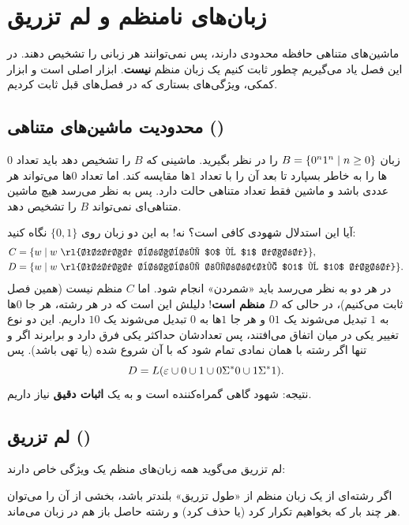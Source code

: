 \chapter{زبان‌های نامنظم و لم تزریق}

ماشین‌های متناهی حافظه محدودی دارند، پس نمی‌توانند هر زبانی را تشخیص دهند. در این فصل یاد می‌گیریم چطور ثابت کنیم یک زبان منظم \textbf{نیست}. ابزار اصلی  است و ابزار کمکی، ویژگی‌های بستاری که در فصل‌های قبل ثابت کردیم.

\section{محدودیت ماشین‌های متناهی ()}

زبان $B=\{0^n1^n\mid n\ge0\}$ را در نظر بگیرید. ماشینی که $B$ را تشخیص دهد باید تعداد $0$ها را به خاطر بسپارد تا بعد آن را با تعداد $1$ها مقایسه کند. اما تعداد $0$ها می‌تواند هر عددی باشد و ماشین فقط تعداد متناهی حالت دارد. پس به نظر می‌رسد هیچ ماشین متناهی‌ای نمی‌تواند $B$ را تشخیص دهد.

آیا این استدلال شهودی کافی است؟ نه! به این دو زبان روی $\{0,1\}$ نگاه کنید:
\begin{align*}
C&=\{w\st w\ \text{\rl{تعداد برابری $0$ و $1$ دارد}}\},\\
D&=\{w\st w\ \text{\rl{تعداد برابری زیررشته $01$ و $10$ دارد}}\}.
\end{align*}
در هر دو به نظر می‌رسد باید «شمردن» انجام شود. اما $C$ منظم نیست (همین فصل ثابت می‌کنیم)، در حالی که $D$ \textbf{منظم است}! دلیلش این است که در هر رشته، هر جا $0$ها به $1$ تبدیل می‌شوند یک $01$ و هر جا $1$ها به $0$ تبدیل می‌شوند یک $10$ داریم. این دو نوع تغییر یکی در میان اتفاق می‌افتند، پس تعدادشان حداکثر یکی فرق دارد و برابرند اگر و تنها اگر رشته با همان نمادی تمام شود که با آن شروع شده (یا تهی باشد). پس
\[D=L(\varepsilon\cup0\cup1\cup0\Sigma^*0\cup1\Sigma^*1).\]
نتیجه: شهود گاهی گمراه‌کننده است و به یک \textbf{اثبات دقیق} نیاز داریم.

\section{لم تزریق ()}

لم تزریق می‌گوید همه زبان‌های منظم یک ویژگی خاص دارند:

\begin{note}
اگر رشته‌ای از یک زبان منظم از «طول تزریق» بلندتر باشد، بخشی از آن را می‌توان هر چند بار که بخواهیم تکرار کرد (یا حذف کرد) و رشته حاصل باز هم در زبان می‌ماند.
\end{note}


